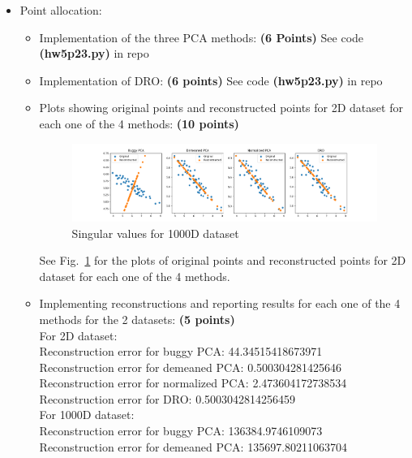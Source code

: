 \documentclass[a4paper]{article}
\theoremstyle{definition}
\newenvironment{soln}{
    \leavevmode\color{blue}\ignorespaces
}{}
\begin{document}
\begin{itemize}
\item Point allocation:
\begin{itemize}
\item Implementation of the three PCA methods: \textbf{(6 Points)}
\begin{soln} See code \textbf{(hw5p23.py)} in repo \end{soln}
\item Implementation of DRO: \textbf{(6 points)}
\begin{soln} See code \textbf{(hw5p23.py)} in repo \end{soln}
\item Plots showing original points and reconstructed points for 2D dataset for each one of the 4 methods: \textbf{(10 points)}
\begin{figure}
    \centering
    \includegraphics[width=1.2\textwidth]{images/PCA_plots.png}
    \caption{Singular values for 1000D dataset}
    \label{fig:pca_plots}
\end{figure}
\begin{soln}
See Fig.~\ref{fig:pca_plots} for the plots of original points and reconstructed points for 2D dataset for each one of the 4 methods.\\
\end {soln}
\item Implementing reconstructions and reporting results for each one of the 4 methods for the 2 datasets: \textbf{(5 points)}
\begin{soln}\\
For 2D dataset:\\
Reconstruction error for buggy PCA: 44.34515418673971\\
Reconstruction error for demeaned PCA: 0.500304281425646\\
Reconstruction error for normalized PCA: 2.473604172738534\\
Reconstruction error for DRO: 0.5003042814256459\\
For 1000D dataset:\\
Reconstruction error for buggy PCA: 136384.9746109073\\
Reconstruction error for demeaned PCA: 135697.80211063704\\

\end{soln}
\end{itemize}
\end{itemize}
\end{document}
